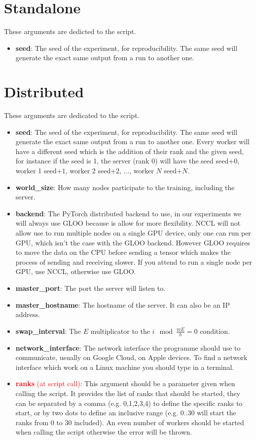 \section{Standalone}
These arguments are dedicted to the  script.
\begin{itemize}
    \item \textbf{seed}: The seed of the experiment, for reproducibility. The same seed will generate the exact same output from a run to another one.
\end{itemize}

\section{Distributed}
These arguments are dedicated to the  script.
\begin{itemize}
    \item \textbf{seed}: The seed of the experiment, for reproducibility. The same seed will generate the exact same output from a run to another one. Every worker will have a different seed which is the addition of their rank and the given seed, for instance if the seed is 1, the server (rank 0) will have the seed seed+$0$, worker 1 seed+$1$, worker 2 seed+$2$, ..., worker $N$ seed+$N$.
    \item \textbf{world\_size}: How many nodes participate to the training, including the server.
    \item \textbf{backend}: The PyTorch distributed backend to use, in our experiments we will always use GLOO because is allow for more flexibility. NCCL will not allow use to run multiple nodes on a single GPU device, only one can run per GPU, which isn't the case with the GLOO backend. However GLOO requires to move the data on the CPU before sending a tensor which makes the process of sending and receiving slower. If you attend to run a single node per GPU, use NCCL, otherwise use GLOO.
    \item \textbf{master\_port}: The port the server will listen to.
    \item \textbf{master\_hostname}: The hostname of the server. It can also be an IP address.
    \item \textbf{swap\_interval}: The $E$ multiplicator to the $i \mod \frac{mE}{b} = 0$ condition.
    \item \textbf{network\_interface}: The network interface the programme should use to communicate, usually  on Google Cloud,  on Apple devices. To find a network interface which work on a Linux machine you should type  in a terminal.
    \item \textcolor{red}{\textbf{ranks} (at script call)}: This argument should be a parameter given when calling the script. It provides the list of ranks that should be started, they can be separated by a comma (e.g. 0,1,2,3,4) to define the specific ranks to start, or by two dots to define an inclusive range (e.g. 0..30 will start the ranks from 0 to 30 included). An even number of workers should be started when calling the script otherwise the error  will be thrown.
\end{itemize}
